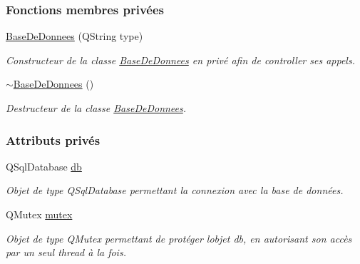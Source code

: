 \subsubsection*{Fonctions membres privées}
\begin{DoxyCompactItemize}
\item 
\hyperlink{class_base_de_donnees_a10dd177f1008f675ab78c2221b2a6750}{Base\+De\+Donnees} (Q\+String type)
\begin{DoxyCompactList}\small\item\em Constructeur de la classe \hyperlink{class_base_de_donnees}{Base\+De\+Donnees} en privé afin de controller ses appels. \end{DoxyCompactList}\item 
\hyperlink{class_base_de_donnees_a5dc474cdbe003644fb0ca7b8f2ec6b93}{$\sim$\+Base\+De\+Donnees} ()
\begin{DoxyCompactList}\small\item\em Destructeur de la classe \hyperlink{class_base_de_donnees}{Base\+De\+Donnees}. \end{DoxyCompactList}\end{DoxyCompactItemize}
\subsubsection*{Attributs privés}
\begin{DoxyCompactItemize}
\item 
Q\+Sql\+Database \hyperlink{class_base_de_donnees_a3e738dcf443370c46a541677ab619f06}{db}
\begin{DoxyCompactList}\small\item\em Objet de type Q\+Sql\+Database permettant la connexion avec la base de données. \end{DoxyCompactList}\item 
Q\+Mutex \hyperlink{class_base_de_donnees_aa1b4696fac87a740f914aa73739086f2}{mutex}
\begin{DoxyCompactList}\small\item\em Objet de type Q\+Mutex permettant de protéger l\textquotesingle{}objet db, en autorisant son accès par un seul thread à la fois. \end{DoxyCompactList}\end{DoxyCompactItemize}
